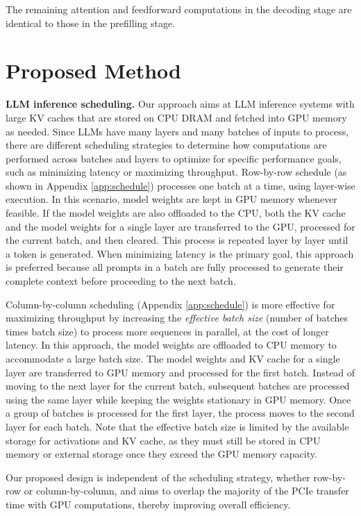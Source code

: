\documentclass[11pt]{article}
\begin{document}
The remaining attention and feedforward computations in the decoding stage are identical to those in the prefilling stage.


\section{Proposed Method}
\textbf{LLM inference scheduling.} Our approach aims at LLM inference systems with large KV caches that are stored on CPU DRAM and fetched into GPU memory as needed. Since LLMs have many layers and many batches of inputs to process, there are different scheduling strategies to determine how computations are performed across batches and layers to optimize for specific performance goals, such as minimizing latency or maximizing throughput.  
Row-by-row schedule (as shown in Appendix \ref{app:schedule}) processes one batch at a time, using layer-wise execution. In this scenario, model weights are kept in GPU memory whenever feasible. If the model weights are also offloaded to the CPU, both the KV cache and the model weights for a single layer are transferred to the GPU, processed for the current batch, and then cleared. This process is repeated layer by layer until a token is generated. When minimizing latency is the primary goal, this approach is preferred because all prompts in a batch are fully processed to generate their complete context before proceeding to the next batch.

Column-by-column scheduling (Appendix \ref{app:schedule}) is more effective for maximizing throughput by increasing the \emph{effective batch size} (number of batches times batch size) to process more sequences in parallel, at the cost of longer latency. In this approach, the model weights are offloaded to CPU memory to accommodate a large batch size. The model weights and KV cache for a single layer are transferred to GPU memory and processed for the first batch. Instead of moving to the next layer for the current batch, subsequent batches are processed using the same layer while keeping the weights stationary in GPU memory. Once a group of batches is processed for the first layer, the process moves to the second layer for each batch. Note that the effective batch size is limited by the available storage for activations and KV cache, as they must still be stored in CPU memory or external storage once they exceed the GPU memory capacity. 

Our proposed design is independent of the scheduling strategy, whether row-by-row or column-by-column, and aims to overlap the majority of the PCIe transfer time with GPU computations, thereby improving overall efficiency.
\end{document}
